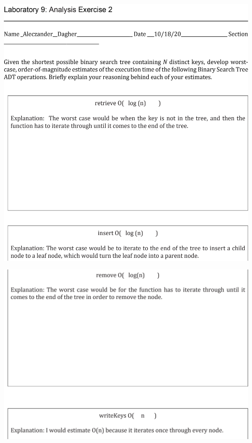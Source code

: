 \begin{DoxyImageNoCaption}
  \mbox{\includegraphics[width=17cm]{Lab9Sheet6.png}}
\end{DoxyImageNoCaption}



\begin{DoxyImageNoCaption}
  \mbox{\includegraphics[width=17cm]{Lab9Sheet7.png}}
\end{DoxyImageNoCaption}
 